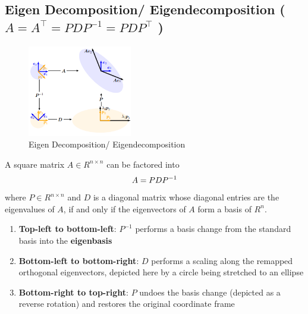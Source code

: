 \subsection{Eigen Decomposition/ Eigendecomposition ( $A = A^\top = PDP^{-1} = PDP^\top$ ) \cite{mfml-1}}\label{Eigen Decomposition/ Eigendecomposition}

\begin{table}[h]
    \begin{minipage}{0.30\linewidth}
        \begin{figure}[H]
            \centering
            \includegraphics[width=\linewidth, height=4cm, keepaspectratio]{Pictures/maths/Eigendecomposition.png}
            \caption{Eigen Decomposition/ Eigendecomposition}
        \end{figure}
    \end{minipage}
    \hfill
    \begin{minipage}{0.68\linewidth}
        \begin{theorem}
            A square matrix $A \in  R^{n\times n}$ can be factored into
            \[
               \hfill A = PDP^{-1} \hfill
            \]
            where $P \in  R^{n\times n}$ and $D$ is a diagonal matrix whose diagonal entries are the eigenvalues of $A$, if and only if the eigenvectors of $A$ form a basis of $R^n$.
        \end{theorem}
    \end{minipage}    
\end{table}


\begin{enumerate}
    \item \textbf{Top-left to bottom-left}: $P^{-1}$ performs a basis change from the standard basis into the \textbf{eigenbasis}

    \item \textbf{Bottom-left to bottom-right}: $D$ performs a scaling along the remapped orthogonal eigenvectors, depicted here by a circle being stretched to an ellipse

    \item \textbf{Bottom-right to top-right}: $P$ undoes the basis change (depicted as a reverse rotation) and restores the original coordinate frame
    
\end{enumerate}


